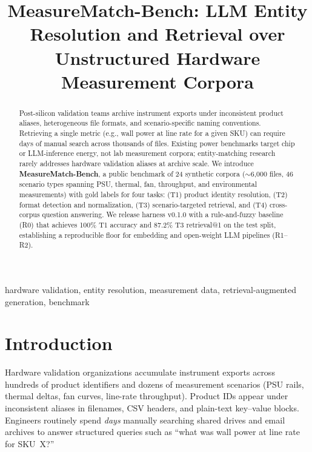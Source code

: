 \documentclass[conference]{IEEEtran}
\begin{document}
\title{MeasureMatch-Bench: LLM Entity Resolution and Retrieval over Unstructured Hardware Measurement Corpora}

\author{
}

\maketitle

\begin{abstract}
Post-silicon validation teams archive instrument exports under inconsistent product aliases, heterogeneous file formats, and scenario-specific naming conventions.
Retrieving a single metric (e.g., wall power at line rate for a given SKU) can require days of manual search across thousands of files.
Existing power benchmarks target chip or LLM-inference energy, not lab measurement corpora; entity-matching research rarely addresses hardware validation aliases at archive scale.
We introduce \textbf{MeasureMatch-Bench}, a public benchmark of 24 synthetic corpora ($\sim$6{,}000 files, 46 scenario types spanning PSU, thermal, fan, throughput, and environmental measurements) with gold labels for four tasks: (T1) product identity resolution, (T2) format detection and normalization, (T3) scenario-targeted retrieval, and (T4) cross-corpus question answering.
We release harness v0.1.0 with a rule-and-fuzzy baseline (R0) that achieves 100\% T1 accuracy and 87.2\% T3 retrieval@1 on the test split, establishing a reproducible floor for embedding and open-weight LLM pipelines (R1--R2).
\end{abstract}

\begin{IEEEkeywords}
hardware validation, entity resolution, measurement data, retrieval-augmented generation, benchmark
\end{IEEEkeywords}

\section{Introduction}
Hardware validation organizations accumulate instrument exports across hundreds of product identifiers and dozens of measurement scenarios (PSU rails, thermal deltas, fan curves, line-rate throughput).
Product IDs appear under inconsistent aliases in filenames, CSV headers, and plain-text key--value blocks.
Engineers routinely spend \emph{days} manually searching shared drives and email archives to answer structured queries such as ``what was wall power at line rate for SKU~X?''
\end{document}
